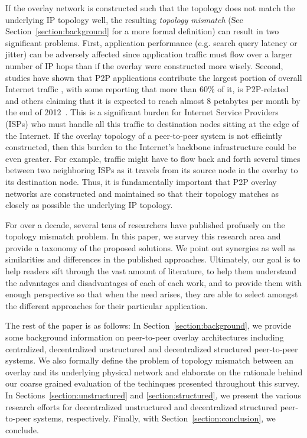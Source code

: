 If the overlay network is constructed such that the topology does not match the 
underlying IP topology well, the resulting \emph{topology mismatch} (See
Section~\ref{section:background} for a more formal definition) can result in two
significant problems. First, application performance (e.g. search query latency
or jitter) can be adversely affected since application traffic must flow over a
larger number of IP hops than if the overlay were constructed more wisely.
Second, studies have shown that P2P applications contribute the largest portion
of overall Internet traffic
\cite{seroiu_analysiscds_2002,sen_analyzep2ptraffic_2004,krp_ispfear_2005}, with
some reporting that more than 60\% of it, is
P2P-related~\cite{cachelogic,ipoque2007,ipoque2009} and others claiming that it
is expected to reach almost 8 petabytes per month by the end of
2012~\cite{multinteligence}. This is a significant burden for Internet Service
Providers (ISPs) who must handle all this traffic to destination nodes sitting
at the edge of the Internet. If the overlay topology of a peer-to-peer system is
not efficintly constructed, then this burden to the Internet's backbone
infrastructure could be even greater. For example, traffic might have to flow
back and forth several times between two neighboring ISPs as it travels from its
source node in the overlay to its destination node. Thus, it is fundamentally
important that P2P overlay networks are constructed and maintained so that
their topology matches as closely as possible the underlying IP topology. 

For over a decade, several tens of researchers have published profusely on the 
topology mismatch problem.  In this paper, we survey this research area and
provide a taxonomy of the proposed solutions. We point out synergies as well as
similarities and differences in the published approaches. Ultimately, our goal
is to help readers sift through the vast amount of literature, to help them
understand the advantages and disadvantages of each of each work, and to provide
them with enough perspective so that when the need arises, they are able to
select amongst the different approaches for their particular application.

The rest of the paper is as follows: In Section~\ref{section:background}, we
provide some background information on peer-to-peer overlay architectures
including centralized, decentralized unstructured and decentralized structured
peer-to-peer systems. We also formally define the problem of topology mismatch
between an overlay and its underlying physical network and elaborate on the
rationale behind our coarse grained evaluation of the techinques presented
throughout this survey. In Sections~\ref{section:unstructured} and
\ref{section:structured}, we present the various research efforts for
decentralized unstructured and decentralized structured peer-to-peer systems,
respectively. Finally, with Section~\ref{section:conclusion}, we
conclude.
